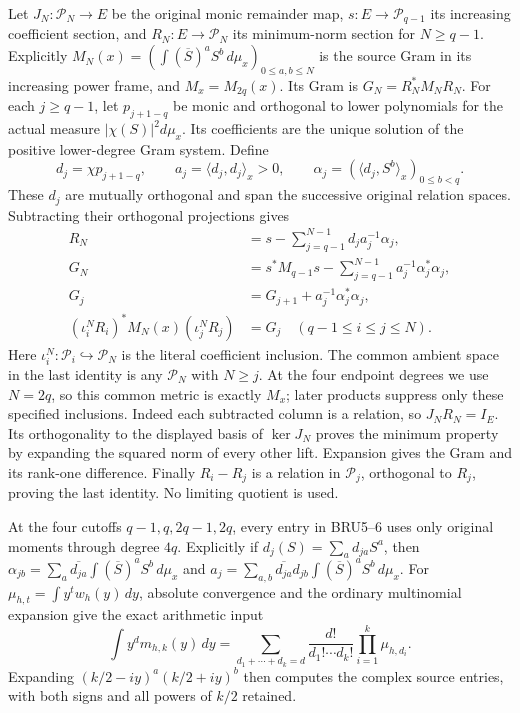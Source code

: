 Let $J_N:\mathcal P_N\to E$ be the original monic remainder map,
$s:E\to\mathcal P_{q-1}$ its increasing coefficient section, and
$R_N:E\to\mathcal P_N$ its minimum-norm section for $N\geq q-1$.
Explicitly $M_N(x)=(\int(\overline S)^aS^b\,d\mu_x)_{0\leq a,b\leq N}$
is the source Gram in its increasing power frame, and $M_x=M_{2q}(x)$.
Its Gram is $G_N=R_N^*M_NR_N$. For each $j\geq q-1$, let $p_{j+1-q}$
be monic and orthogonal to lower polynomials for the actual measure
$|\chi(S)|^2d\mu_x$. Its coefficients are the unique solution of the
positive lower-degree Gram system. Define
\[
 d_j=\chi p_{j+1-q},\qquad
 a_j=\langle d_j,d_j\rangle_x>0,\qquad
 \alpha_j=(\langle d_j,S^b\rangle_x)_{0\leq b<q}.
 \tag{BRU5}
\]
These $d_j$ are mutually orthogonal and span the successive original
relation spaces. Subtracting their orthogonal projections gives
\[
 \begin{aligned}
 R_N&=s-\sum_{j=q-1}^{N-1}d_j a_j^{-1}\alpha_j,\\
 G_N&=s^*M_{q-1}s-\sum_{j=q-1}^{N-1}a_j^{-1}\alpha_j^*\alpha_j,\\
 G_j&=G_{j+1}+a_j^{-1}\alpha_j^*\alpha_j,\\
 (\iota_i^N R_i)^*M_N(x)(\iota_j^N R_j)
    &=G_j\quad(q-1\leq i\leq j\leq N).
 \end{aligned}\tag{BRU6}
\]
Here $\iota_i^N:\mathcal P_i\hookrightarrow\mathcal P_N$ is the
literal coefficient inclusion. The common ambient space in the last
identity is any $\mathcal P_N$ with $N\geq j$. At the four endpoint
degrees we use $N=2q$, so this common metric is exactly $M_x$;
later products suppress only these specified inclusions.
Indeed each subtracted column is a relation, so $J_NR_N=I_E$.
Its orthogonality to the displayed basis of $\ker J_N$ proves
the minimum property by expanding the squared norm of every
other lift. Expansion gives the Gram and its rank-one difference.
Finally $R_i-R_j$ is a relation in $\mathcal P_j$, orthogonal
to $R_j$, proving the last identity. No limiting quotient is used.

At the four cutoffs $q-1,q,2q-1,2q$, every entry in BRU5--6 uses
only original moments through degree $4q$. Explicitly if
$d_j(S)=\sum_a d_{ja}S^a$, then
$\alpha_{jb}=\sum_a\overline{d_{ja}}
\int(\overline S)^aS^b\,d\mu_x$ and
$a_j=\sum_{a,b}\overline{d_{ja}}d_{jb}
\int(\overline S)^aS^b\,d\mu_x$.
For $\mu_{h,t}=\int y^t w_h(y)\,dy$, absolute convergence and
the ordinary multinomial expansion give the exact arithmetic input
\[
 \int y^d m_{h,k}(y)\,dy
 =\sum_{d_1+\cdots+d_k=d}\frac{d!}{d_1!\cdots d_k!}
                  \prod_{i=1}^k\mu_{h,d_i}.
 \tag{BRU7}
\]
Expanding $(k/2-iy)^a(k/2+iy)^b$ then computes the complex
source entries, with both signs and all powers of $k/2$ retained.

